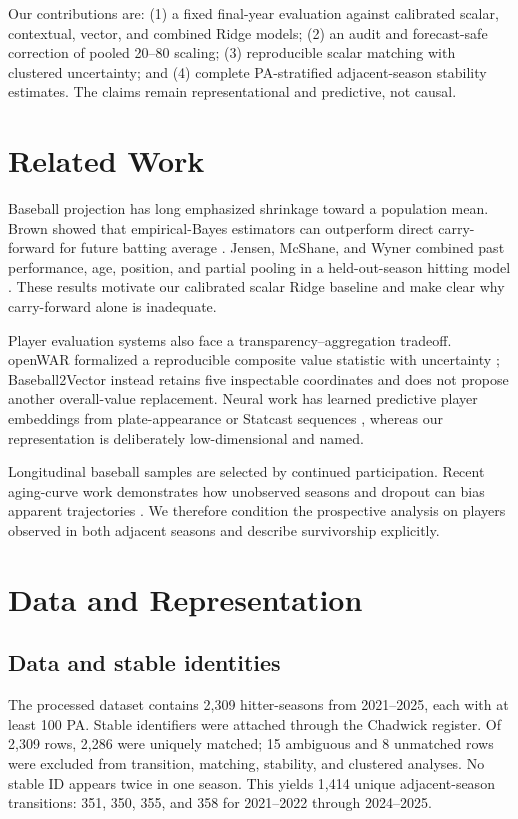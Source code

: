\documentclass[10pt,twocolumn,letterpaper]{article}
\begin{document}
Our contributions are: (1) a fixed final-year evaluation against calibrated scalar, contextual, vector, and combined Ridge models; (2) an audit and forecast-safe correction of pooled 20--80 scaling; (3) reproducible scalar matching with clustered uncertainty; and (4) complete PA-stratified adjacent-season stability estimates. The claims remain representational and predictive, not causal.

\section{Related Work}
Baseball projection has long emphasized shrinkage toward a population mean. Brown showed that empirical-Bayes estimators can outperform direct carry-forward for future batting average \cite{brown2008}. Jensen, McShane, and Wyner combined past performance, age, position, and partial pooling in a held-out-season hitting model \cite{jensen2009}. These results motivate our calibrated scalar Ridge baseline and make clear why carry-forward alone is inadequate.

Player evaluation systems also face a transparency--aggregation tradeoff. openWAR formalized a reproducible composite value statistic with uncertainty \cite{baumer2015}; Baseball2Vector instead retains five inspectable coordinates and does not propose another overall-value replacement. Neural work has learned predictive player embeddings from plate-appearance or Statcast sequences \cite{alcorn2016,heaton2021}, whereas our representation is deliberately low-dimensional and named.

Longitudinal baseball samples are selected by continued participation. Recent aging-curve work demonstrates how unobserved seasons and dropout can bias apparent trajectories \cite{nguyen2024}. We therefore condition the prospective analysis on players observed in both adjacent seasons and describe survivorship explicitly.

\section{Data and Representation}
\subsection{Data and stable identities}
The processed dataset contains 2,309 hitter-seasons from 2021--2025, each with at least 100 PA. Stable identifiers were attached through the Chadwick register. Of 2,309 rows, 2,286 were uniquely matched; 15 ambiguous and 8 unmatched rows were excluded from transition, matching, stability, and clustered analyses. No stable ID appears twice in one season. This yields 1,414 unique adjacent-season transitions: 351, 350, 355, and 358 for 2021--2022 through 2024--2025.
\end{document}
